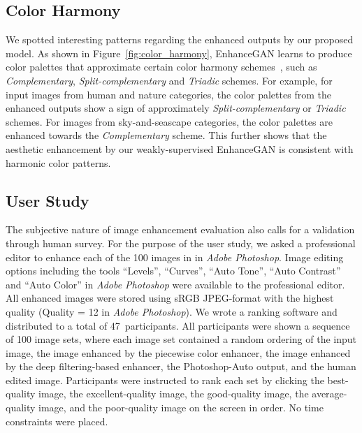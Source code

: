 \documentclass[sigconf]{acmart}
\newcommand{\totaluser}{47}
\begin{document}
\subsection{Color Harmony}
We spotted interesting patterns regarding the enhanced outputs by our proposed model. As shown in Figure~\ref{fig:color_harmony}, EnhanceGAN learns to produce color palettes that approximate certain color harmony schemes~\cite{cohen2006color}, such as \textit{Complementary}, \textit{Split-complementary} and \textit{Triadic} schemes. For example, for input images from human and nature categories, the color palettes from the enhanced outputs show a sign of approximately \textit{Split-complementary} or \textit{Triadic} schemes. For images from sky-and-seascape categories, the color palettes are enhanced towards the \textit{Complementary} scheme. This further shows that the aesthetic enhancement by our weakly-supervised EnhanceGAN is consistent with harmonic color patterns.




\subsection{User Study}
\label{sec:userstudy}
The subjective nature of image enhancement evaluation also calls for a validation through human survey. For the purpose of the user study, we asked a professional editor to enhance each of the 100 images in  in \textit{Adobe Photoshop}. Image editing options including the tools ``Levels'', ``Curves'', ``Auto Tone'',  ``Auto Contrast'' and ``Auto Color'' in \textit{Adobe Photoshop} were available to the professional editor. All enhanced images were stored using sRGB JPEG-format with the highest quality (Quality = 12 in \textit{Adobe Photoshop}). We wrote a ranking software and distributed to a total of \totaluser~participants.
All participants were shown a sequence of 100 image sets, where each image set contained a random ordering of the input image, the image enhanced by the piecewise color enhancer, the image enhanced by the deep filtering-based enhancer, \color{black}the Photoshop-Auto output, \color{black} and the human edited image. Participants were instructed to rank each set by clicking the best-quality image, the excellent-quality image, the good-quality image, the average-quality image, and the poor-quality image on the screen in order. No time constraints were placed.
\end{document}
